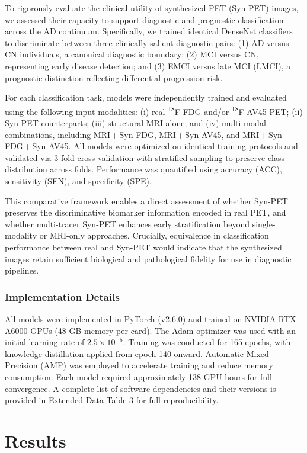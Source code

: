 \documentclass[a4paper]{cas-sc}
\begin{document}
To rigorously evaluate the clinical utility of synthesized PET (Syn-PET) images, we assessed their capacity to support diagnostic and prognostic classification across the AD continuum. Specifically, we trained identical DenseNet classifiers~\citep{huang2017densely} to discriminate between three clinically salient diagnostic pairs: (1)  AD versus CN individuals, a canonical diagnostic boundary; (2)  MCI versus CN, representing early disease detection; and (3) EMCI versus late MCI (LMCI), a prognostic distinction reflecting differential progression risk. 

For each classification task, models were independently trained and evaluated using the following input modalities: (i) real \textsuperscript{18}F-FDG and/or \textsuperscript{18}F-AV45 PET; (ii) Syn-PET counterparts; (iii) structural MRI alone; and (iv) multi-modal combinations, including MRI\,+\,Syn-FDG, MRI\,+\,Syn-AV45, and MRI\,+\,Syn-FDG\,+\,Syn-AV45. All models were optimized on identical training protocols and validated via 3-fold cross-validation with stratified sampling to preserve class distribution across folds. Performance was quantified using accuracy (ACC), sensitivity (SEN), and specificity (SPE).

This comparative framework enables a direct assessment of whether Syn-PET preserves the discriminative biomarker information encoded in real PET, and whether multi-tracer Syn-PET enhances early stratification beyond single-modality or MRI-only approaches. Crucially, equivalence in classification performance between real and Syn-PET would indicate that the synthesized images retain sufficient biological and pathological fidelity for use in diagnostic pipelines.
\subsubsection{Implementation Details}

All models were implemented in PyTorch (v2.6.0) and trained on NVIDIA RTX A6000 GPUs (48 GB memory per card). The Adam optimizer was used with an initial learning rate of $2.5 \times 10^{-5}$. Training was conducted for 165 epochs, with knowledge distillation applied from epoch 140 onward. Automatic Mixed Precision (AMP) was employed to accelerate training and reduce memory consumption. Each model required approximately 138 GPU hours for full convergence. A complete list of software dependencies and their versions is provided in Extended Data Table 3 for full reproducibility.

\section{Results}\label{sec2}
\end{document}
